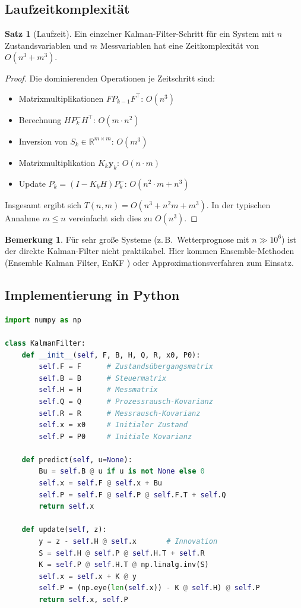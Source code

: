 ﻿\documentclass[a4paper,12pt]{article}
\theoremstyle{definition}
\newtheorem{satz}{Satz}
\newtheorem{bemerkung}{Bemerkung}
\begin{document}
\subsection{Laufzeitkomplexität}

\begin{satz}[Laufzeit]
    Ein einzelner Kalman-Filter-Schritt für ein System mit $n$ Zustandsvariablen
    und $m$ Messvariablen hat eine Zeitkomplexität von $O(n^3 + m^3)$.
\end{satz}

\begin{proof}
Die dominierenden Operationen je Zeitschritt sind:
\begin{itemize}
    \item Matrixmultiplikationen $F P_{k-1} F^\top$: $O(n^3)$
    \item Berechnung $H P_k^- H^\top$: $O(m \cdot n^2)$
    \item Inversion von $S_k \in \mathbb{R}^{m \times m}$: $O(m^3)$
    \item Matrixmultiplikation $K_k \mathbf{y}_k$: $O(n \cdot m)$
    \item Update $P_k = (I - K_k H) P_k^-$: $O(n^2 \cdot m + n^3)$
\end{itemize}
Insgesamt ergibt sich $T(n, m) = O(n^3 + n^2 m + m^3)$.
In der typischen Annahme $m \leq n$ vereinfacht sich dies zu $O(n^3)$.
\end{proof}

\begin{bemerkung}
    Für sehr große Systeme (z.\,B.\ Wetterprognose mit $n \gg 10^6$) ist der direkte
    Kalman-Filter nicht praktikabel. Hier kommen Ensemble-Methoden (Ensemble Kalman
    Filter, EnKF \cite{evensen1994}) oder Approximationsverfahren zum Einsatz.
\end{bemerkung}

\subsection{Implementierung in Python}

\begin{lstlisting}[language=Python, caption=Kalman-Filter in Python/NumPy]
import numpy as np

class KalmanFilter:
    def __init__(self, F, B, H, Q, R, x0, P0):
        self.F = F      # Zustandsübergangsmatrix
        self.B = B      # Steuermatrix
        self.H = H      # Messmatrix
        self.Q = Q      # Prozessrausch-Kovarianz
        self.R = R      # Messrausch-Kovarianz
        self.x = x0     # Initialer Zustand
        self.P = P0     # Initiale Kovarianz

    def predict(self, u=None):
        Bu = self.B @ u if u is not None else 0
        self.x = self.F @ self.x + Bu
        self.P = self.F @ self.P @ self.F.T + self.Q
        return self.x

    def update(self, z):
        y = z - self.H @ self.x       # Innovation
        S = self.H @ self.P @ self.H.T + self.R
        K = self.P @ self.H.T @ np.linalg.inv(S)
        self.x = self.x + K @ y
        self.P = (np.eye(len(self.x)) - K @ self.H) @ self.P
        return self.x, self.P
\end{lstlisting}
\end{document}
